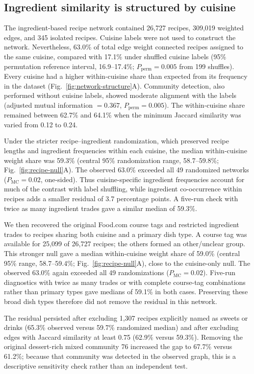 \subsection*{Ingredient similarity is structured by cuisine}
The ingredient-based recipe network contained 26,727 recipes, 309,019 weighted edges, and 345 isolated recipes. Cuisine labels were not used to construct the network. Nevertheless, 63.0\% of total edge weight connected recipes assigned to the same cuisine, compared with 17.1\% under shuffled cuisine labels (95\% permutation reference interval, 16.9--17.4\%; $P_{\mathrm{perm}}=0.005$ from 199 shuffles). Every cuisine had a higher within-cuisine share than expected from its frequency in the dataset (Fig.~\ref{fig:network-structure}A). Community detection, also performed without cuisine labels, showed moderate alignment with the labels (adjusted mutual information $=0.367$, $P_{\mathrm{perm}}=0.005$). The within-cuisine share remained between 62.7\% and 64.1\% when the minimum Jaccard similarity was varied from 0.12 to 0.24.

Under the stricter recipe--ingredient randomization, which preserved recipe lengths and ingredient frequencies within each cuisine, the median within-cuisine weight share was 59.3\% (central 95\% randomization range, 58.7--59.8\%; Fig.~\ref{fig:recipe-null}A). The observed 63.0\% exceeded all 49 randomized networks ($P_{\mathrm{MC}}=0.02$, one-sided). Thus cuisine-specific ingredient frequencies account for much of the contrast with label shuffling, while ingredient co-occurrence within recipes adds a smaller residual of 3.7 percentage points. A five-run check with twice as many ingredient trades gave a similar median of 59.3\%.

We then recovered the original Food.com course tags and restricted ingredient trades to recipes sharing both cuisine and a primary dish type. A course tag was available for 25,099 of 26,727 recipes; the others formed an other/unclear group. This stronger null gave a median within-cuisine weight share of 59.0\% (central 95\% range, 58.7--59.4\%; Fig.~\ref{fig:recipe-null}A), close to the cuisine-only null. The observed 63.0\% again exceeded all 49 randomizations ($P_{\mathrm{MC}}=0.02$). Five-run diagnostics with twice as many trades or with complete course-tag combinations rather than primary types gave medians of 59.1\% in both cases. Preserving these broad dish types therefore did not remove the residual in this network.

The residual persisted after excluding 1,307 recipes explicitly named as sweets or drinks (65.3\% observed versus 59.7\% randomized median) and after excluding edges with Jaccard similarity at least 0.75 (62.9\% versus 59.3\%). Removing the original dessert-rich mixed community 76 increased the gap to 67.7\% versus 61.2\%; because that community was detected in the observed graph, this is a descriptive sensitivity check rather than an independent test.

